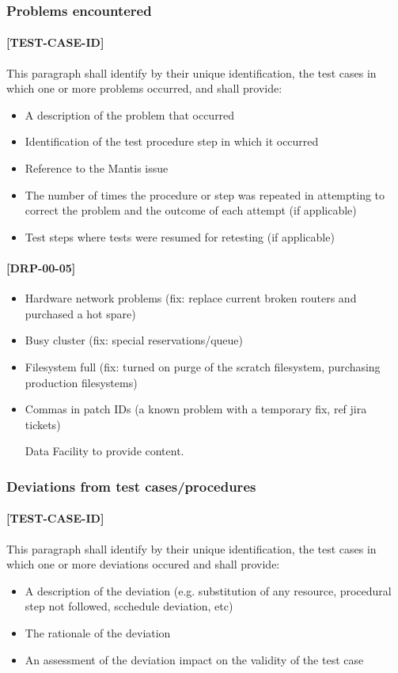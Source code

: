 \documentclass[DM,lsstdraft,STR,toc]{lsstdoc}
\begin{document}
\subsubsection{Problems encountered}
\paragraph{[TEST-CASE-ID]}
This paragraph shall identify by their unique identification, the test cases in which one or more problems occurred, and shall provide:
\begin{itemize}
\item A description of the problem that occurred
\item Identification of the test procedure step in which it occurred
\item Reference to the Mantis issue
\item The number of times the procedure or step was repeated in attempting to correct the problem and the outcome of each attempt (if applicable)
\item Test steps where tests were resumed for retesting (if applicable)
\end{itemize}

\paragraph{[DRP-00-05]}
\begin{itemize}
  \item Hardware network problems (fix: replace current broken routers and purchased a hot spare)
  \item Busy cluster (fix: special reservations/queue)
  \item Filesystem full (fix: turned on purge of the scratch filesystem, purchasing production filesystems)
  \item Commas in patch IDs (a known problem with a temporary fix, ref jira tickets)
\begin{note}
Data Facility to provide content.
\end{note}
\end{itemize}

\subsubsection{Deviations from test cases/procedures}
\paragraph{[TEST-CASE-ID]}
This paragraph shall identify by their unique identification, the test cases in which one or more deviations occured and shall provide:
\begin{itemize}
\item A description of the deviation (e.g. substitution of any resource, procedural step not followed, scchedule deviation, etc)
\item The rationale of the deviation
\item An assessment of the deviation impact on the validity of the test case
\end{itemize}
\end{document}
